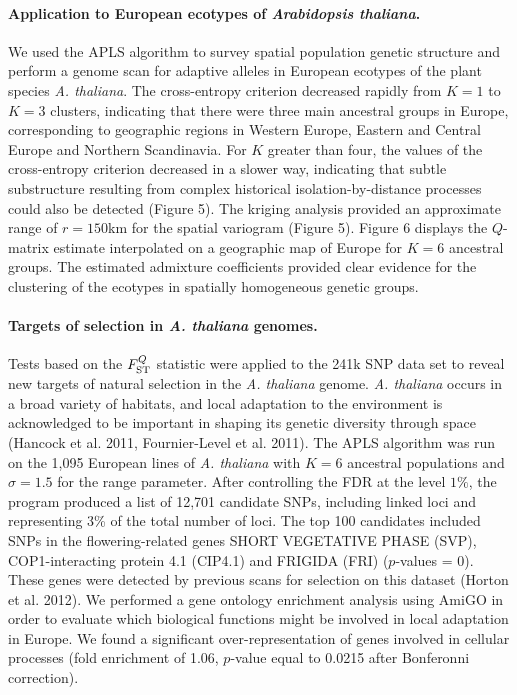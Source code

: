  
\paragraph{Application to European ecotypes of {\it Arabidopsis  thaliana}.} We used  the APLS algorithm to survey spatial population genetic structure and perform a genome scan for adaptive alleles in European ecotypes of the plant species {\it A.  thaliana}. The cross-entropy criterion decreased rapidly from $K=1$ to $K=3$ clusters,  indicating  that  there were three main ancestral groups in Europe, corresponding to geographic regions in Western Europe, Eastern and Central Europe and Northern Scandinavia. For $K$ greater than four, the values of the cross-entropy criterion decreased in a slower way, indicating that subtle substructure resulting from complex historical isolation-by-distance  processes could also be detected (Figure 5). The kriging analysis provided an approximate range of  $r = 150$km for the spatial variogram (Figure 5). Figure 6 displays the $Q$-matrix estimate  interpolated on a geographic map of Europe for $K = 6$ ancestral groups. The estimated admixture coefficients provided clear evidence for the clustering of the ecotypes in spatially homogeneous genetic groups. 

\paragraph{Targets of selection in {\it A.  thaliana} genomes.}  Tests based on the $F^Q_{\rm ST}$  statistic were applied to the 241k SNP data set to reveal new targets of natural selection in the {\it A. thaliana} genome. {\it A. thaliana} occurs in a broad variety of habitats, and local adaptation to the environment is acknowledged to be important in shaping its genetic diversity through space (Hancock et al. 2011, Fournier-Level et al. 2011). 
The APLS algorithm was run on the 1,095 European lines of {\it A. thaliana} with $K=6$ ancestral populations and $\sigma = 1.5$ for the range parameter. After controlling the FDR at the level $1\%$, the program produced a list of 12,701 candidate SNPs, including linked loci and representing 3\% of the total number of loci. 
 The top 100 candidates included SNPs in the flowering-related genes SHORT VEGETATIVE PHASE (SVP), COP1-interacting protein 4.1 (CIP4.1) and FRIGIDA (FRI) ($p$-values = 0). These genes were detected by previous scans for selection on this dataset (Horton et al. 2012).
 We performed a gene ontology enrichment analysis using AmiGO in order to evaluate which biological functions might be involved in local adaptation in Europe. 
 We found a significant over-representation of genes involved in cellular processes (fold enrichment of 1.06, $p$-value equal to 0.0215 after Bonferonni correction).


